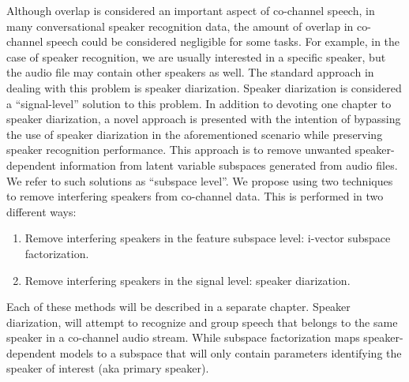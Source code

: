 Although overlap is considered an important aspect of co-channel speech, in many conversational speaker recognition data, the amount of overlap in co-channel speech could be considered negligible for some tasks. 
For example, in the case of speaker recognition, we are usually interested in a specific speaker, but the audio file may contain other speakers as well. 
The standard approach in dealing with this problem is speaker diarization. 
Speaker diarization is considered a ``signal-level'' solution to this problem. 
In addition to devoting one chapter to speaker diarization, a novel approach is presented with the intention of bypassing the use of speaker diarization in the aforementioned scenario while preserving speaker recognition performance. 
This approach is to remove unwanted speaker-dependent information from latent variable subspaces generated from audio files. 
We refer to such solutions as ``subspace level''. 
We propose using two techniques to remove interfering speakers from co-channel data. 
This is performed in two different ways: 
\begin{enumerate}
\item Remove interfering speakers in the feature subspace level: i-vector subspace factorization.
\item Remove interfering speakers in the signal level: speaker diarization.
\end{enumerate}
Each of these methods will be described in a separate chapter. 
Speaker diarization, will attempt to recognize and group speech that belongs to the same speaker in a co-channel audio stream. 
While subspace factorization maps speaker-dependent models to a subspace that will only contain parameters identifying the speaker of interest (aka primary speaker). 



 
